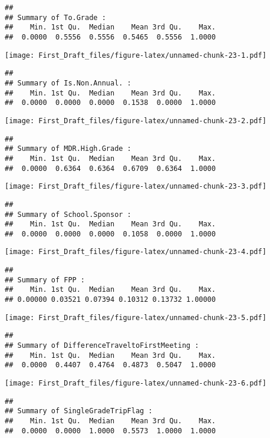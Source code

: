 \documentclass[
]{article}
\begin{document}
\begin{verbatim}
## 
## Summary of To.Grade :
##    Min. 1st Qu.  Median    Mean 3rd Qu.    Max. 
##  0.0000  0.5556  0.5556  0.5465  0.5556  1.0000
\end{verbatim}

\texttt{[image: First\_Draft\_files/figure-latex/unnamed-chunk-23-1.pdf]}

\begin{verbatim}
## 
## Summary of Is.Non.Annual. :
##    Min. 1st Qu.  Median    Mean 3rd Qu.    Max. 
##  0.0000  0.0000  0.0000  0.1538  0.0000  1.0000
\end{verbatim}

\texttt{[image: First\_Draft\_files/figure-latex/unnamed-chunk-23-2.pdf]}

\begin{verbatim}
## 
## Summary of MDR.High.Grade :
##    Min. 1st Qu.  Median    Mean 3rd Qu.    Max. 
##  0.0000  0.6364  0.6364  0.6709  0.6364  1.0000
\end{verbatim}

\texttt{[image: First\_Draft\_files/figure-latex/unnamed-chunk-23-3.pdf]}

\begin{verbatim}
## 
## Summary of School.Sponsor :
##    Min. 1st Qu.  Median    Mean 3rd Qu.    Max. 
##  0.0000  0.0000  0.0000  0.1058  0.0000  1.0000
\end{verbatim}

\texttt{[image: First\_Draft\_files/figure-latex/unnamed-chunk-23-4.pdf]}

\begin{verbatim}
## 
## Summary of FPP :
##    Min. 1st Qu.  Median    Mean 3rd Qu.    Max. 
## 0.00000 0.03521 0.07394 0.10312 0.13732 1.00000
\end{verbatim}

\texttt{[image: First\_Draft\_files/figure-latex/unnamed-chunk-23-5.pdf]}

\begin{verbatim}
## 
## Summary of DifferenceTraveltoFirstMeeting :
##    Min. 1st Qu.  Median    Mean 3rd Qu.    Max. 
##  0.0000  0.4407  0.4764  0.4873  0.5047  1.0000
\end{verbatim}

\texttt{[image: First\_Draft\_files/figure-latex/unnamed-chunk-23-6.pdf]}

\begin{verbatim}
## 
## Summary of SingleGradeTripFlag :
##    Min. 1st Qu.  Median    Mean 3rd Qu.    Max. 
##  0.0000  0.0000  1.0000  0.5573  1.0000  1.0000
\end{verbatim}
\end{document}
